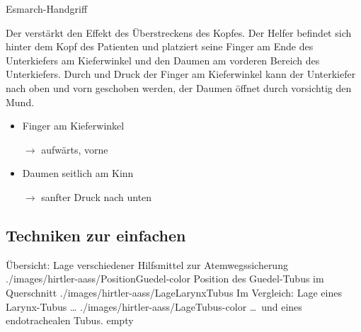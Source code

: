 \TextSlide
{Esmarch-Handgriff}
{Der  verstärkt den Effekt des
Überstreckens des Kopfes. Der Helfer befindet sich hinter
dem Kopf des Patienten und platziert seine Finger
 am Ende des Unterkiefers am Kieferwinkel und
den Daumen am vorderen Bereich des Unterkiefers. Durch 
und  Druck der Finger am
Kieferwinkel kann der Unterkiefer nach oben und vorn
geschoben werden, der Daumen öffnet durch  vorsichtig den Mund. \cite{Erc2010Sec4}

}
{
\begin{itemize}
  \item Finger
 am Kieferwinkel

$\rightarrow$ aufwärts, vorne
\item Daumen seitlich am Kinn

$\rightarrow$  sanfter Druck nach unten
\end{itemize}
}
{}
{}
{}



\subsection{ Techniken zur einfachen }

\begin{PictureSeriesWide}{}{Übersicht: Lage verschiedener
Hilfsmittel zur Atemwegssicherung
\label{fig:uebersicht-lage-atemwegshilfen}}
{./images/hirtler-aass/PositionGuedel-color}
{Position des Guedel-Tubus im Querschnitt}
{./images/hirtler-aass/LageLarynxTubus}
{Im Vergleich: Lage eines Larynx-Tubus \ldots} 
{./images/hirtler-aass/LageTubus-color}
{\ldots\ und eines endotrachealen Tubus.}
{empty}
{}
\end{PictureSeriesWide}

